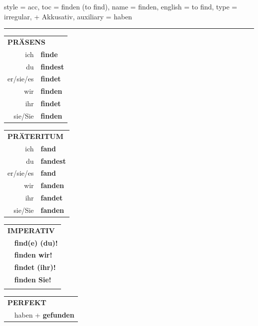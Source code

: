\begin{verbentry}{
  style = {acc},
  toc = {finden (to find)},
  name = {finden},
  english = {to find},
  type = {irregular, + Akkusativ},
  auxiliary = {haben}
}
 
    
     \vspace{5pt}

    \hrule
    
    \vspace{5pt}

  \begin{tabular}{rl}
     \multicolumn{2}{l}{\textbf{PRÄSENS} }\\
    ich & \textbf{finde}\\
    du & \textbf{findest}\\
    er/sie/es & \textbf{findet}\\
    wir & \textbf{finden}\\
    ihr & \textbf{findet}\\
    sie/Sie & \textbf{finden}\\
  \end{tabular}
  \hfill
     \begin{tabular}{rl}
    \multicolumn{2}{l}{\textbf{PRÄTERITUM} }\\
    ich & \textbf{fand}\\
    du & \textbf{fandest}\\
    er/sie/es & \textbf{fand}\\
    wir & \textbf{fanden}\\
    ihr & \textbf{fandet}\\
    sie/Sie & \textbf{fanden}\\
  \end{tabular}
  \hfill
  \begin{tabular}{rl}
     \multicolumn{2}{l}{\textbf{IMPERATIV} }\\
   & \textbf{find(e) (du)!}\\
   & \textbf{finden wir!}\\
   & \textbf{findet (ihr)!}\\
   & \textbf{finden Sie!}\\
   & \vspace{10pt}
  \end{tabular}

    \vspace{10pt}

 \begin{tabular}{rl}
     \multicolumn{2}{l}{\textbf{PERFEKT}}\\
  &  haben + \textbf{gefunden}\\
  \end{tabular}
\hfill
   \begin{tabular}{rl}
   

\end{tabular}
\end{verbentry}
